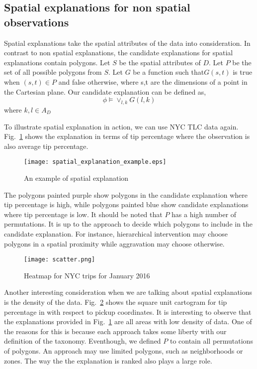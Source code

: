 \subsection{Spatial explanations for non spatial observations}
\label{sec:spatial_nonspatial}

Spatial explanations take the spatial attributes of the data into consideration. In contrast to non spatial explanations, the candidate explanations for spatial explanations contain polygons. Let $S$ be the spatial attributes of $D$. Let $P$ be the set of all possible polygons from $S$. Let $G$ be a function such that$G(s,t)$ is true when $(s,t) \in P$ and false otherwise, where s,t are the dimensions of a point in the Cartesian plane. Our candidate explanation can be defined as,
$$\phi  \models \vee_{l,k} G(l,k)$$
where $k,l \in A_D$

To illustrate spatial explanation in action, we can use NYC TLC data again. Fig.~\ref{fig:spatial_explanation_example} shows the explanation in terms of tip percentage where the observation is also average tip percentage. 

\begin{figure}[ht]
\texttt{[image: spatial\_explanation\_example.eps]}
\caption{An example of spatial explanation}
\label{fig:spatial_explanation_example}
\end{figure}

The polygons painted purple show polygons in the candidate explanation where tip percentage is high, while polygons painted blue show candidate explanations where tip percentage is low. It should be noted that $P$ has a high number of permutations. It is up to the approach to decide which polygons to include in the candidate explanation. For instance, hierarchical intervention may choose polygons in a spatial proximity while aggravation may choose otherwise.
\begin{figure}[ht]
\texttt{[image: scatter.png]}
\caption{Heatmap for NYC trips for January 2016}
\label{fig:square_unit_grid}
\end{figure}

Another interesting consideration when we are talking about spatial explanations is the density of the data. Fig.~\ref{fig:square_unit_grid} shows the square unit cartogram for tip percentage in with respect to pickup coordinates. It is interesting to observe that the explanations provided in Fig.~\ref{fig:spatial_explanation_example} are all areas with low density of data. One of the reasons for this is because each approach takes some liberty with our definition of the taxonomy. Eventhough, we defined $P$ to contain all permutations of polygons. An approach may use limited polygons, such as neighborhoods or zones. The way the the explanation is ranked also plays a large role.

